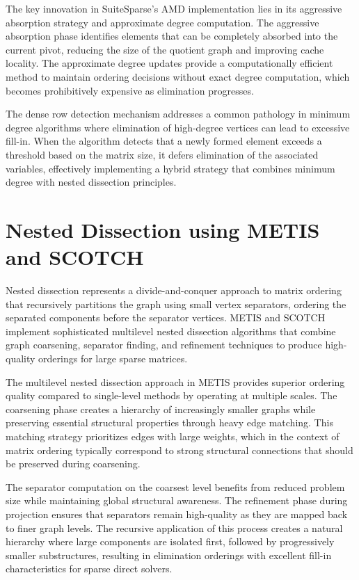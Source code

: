 The key innovation in SuiteSparse's AMD implementation lies in its aggressive absorption strategy and approximate degree computation. The aggressive absorption phase identifies elements that can be completely absorbed into the current pivot, reducing the size of the quotient graph and improving cache locality. The approximate degree updates provide a computationally efficient method to maintain ordering decisions without exact degree computation, which becomes prohibitively expensive as elimination progresses.

The dense row detection mechanism addresses a common pathology in minimum degree algorithms where elimination of high-degree vertices can lead to excessive fill-in. When the algorithm detects that a newly formed element exceeds a threshold based on the matrix size, it defers elimination of the associated variables, effectively implementing a hybrid strategy that combines minimum degree with nested dissection principles.

\section{Nested Dissection using METIS and SCOTCH}
\label{sec:metis_scotch}

Nested dissection represents a divide-and-conquer approach to matrix ordering that recursively partitions the graph using small vertex separators, ordering the separated components before the separator vertices. METIS and SCOTCH implement sophisticated multilevel nested dissection algorithms that combine graph coarsening, separator finding, and refinement techniques to produce high-quality orderings for large sparse matrices.

The multilevel nested dissection approach in METIS provides superior ordering quality compared to single-level methods by operating at multiple scales. The coarsening phase creates a hierarchy of increasingly smaller graphs while preserving essential structural properties through heavy edge matching. This matching strategy prioritizes edges with large weights, which in the context of matrix ordering typically correspond to strong structural connections that should be preserved during coarsening.

The separator computation on the coarsest level benefits from reduced problem size while maintaining global structural awareness. The refinement phase during projection ensures that separators remain high-quality as they are mapped back to finer graph levels. The recursive application of this process creates a natural hierarchy where large components are isolated first, followed by progressively smaller substructures, resulting in elimination orderings with excellent fill-in characteristics for sparse direct solvers.

